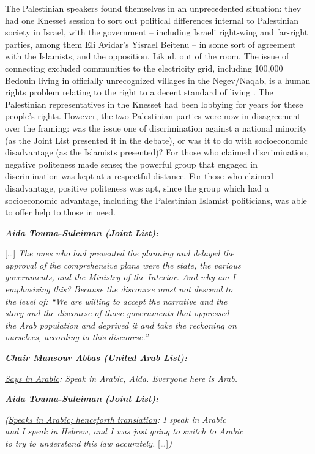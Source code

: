 \documentclass[output=paper,arabicfont]{langscibook}
\begin{document}
\hspace*{-.4pt}The Palestinian speakers found themselves in an unprecedented situation: they had one Knesset session to sort out political differences internal to Palestinian society in Israel, with the government – including Israeli right-wing and far-right parties, among them Eli Avidar’s Yisrael Beitenu – in some sort of agreement with the Islamists, and the opposition, Likud, out of the room. The issue of connecting excluded communities to the electricity grid, including 100,000 Bedouin living in officially unrecognized villages in the Negev/Naqab, is a human rights problem relating to the right to a decent standard of living \citep{forum2020a}. The Palestinian representatives in the Knesset had been lobbying for years for these people’s rights. However, the two Palestinian parties were now in disagreement over the framing: was the issue one of discrimination against a national minority (as the Joint List presented it in the debate), or was it to do with socioeconomic disadvantage (as the Islamists presented)? For those who claimed discrimination, negative politeness made sense; the powerful group that engaged in discrimination was kept at a respectful distance. For those who claimed disadvantage, positive politeness was apt, since the group which had a socioeconomic advantage, including the Palestinian Islamist politicians, was able to offer help to those in need.


\begin{exe} \begin{xlist}
\label{hawker:ex2c}
\textbf{\textit{Aida Touma-Suleiman (Joint List):}} 

[…] \textit{The ones who had prevented the planning and delayed the \\
approval of the comprehensive plans were the state, the various \\
governments, and the Ministry of the Interior. And why am I \\
emphasizing this? Because the discourse must not descend to \\
the level of: “We are willing to accept the narrative and the \\
story and the discourse of those governments that oppressed \\
the Arab population and deprived it and take the reckoning on \\
ourselves, according to this discourse.”}

\textbf{\textit{Chair Mansour Abbas (United Arab List):}}

\textit{\ul{Says in Arabic}: Speak in Arabic, Aida. Everyone here is Arab.}

\textbf{\textit{Aida Touma-Suleiman (Joint List):}}

\textit{(\ul{Speaks in Arabic; henceforth translation}: I speak in Arabic\\
 and I speak in Hebrew, and I was just going to switch to Arabic\\
  to try to understand this law accurately.} […]\textit{)}
   \end{xlist}
\end{exe}
\end{document}

